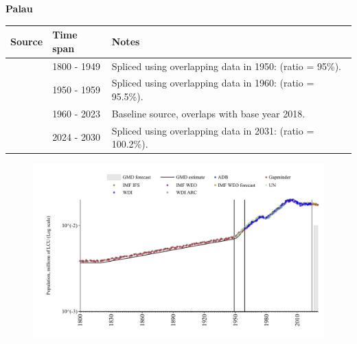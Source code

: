 \documentclass[12pt,a4paper,landscape]{article}
\begin{document}
\begin{adjustbox}{max totalsize={\paperwidth}{\paperheight},center}
\begin{minipage}[t][\textheight][t]{\textwidth}
\vspace*{0.5cm}
{}
\begin{center}
{\Large\bfseries Palau}
\end{center}
\vspace{0.5cm}
\begin{table}[H]
\centering
\small
\begin{tabular}{|l|l|l|}
\hline
\textbf{Source} & \textbf{Time span} & \textbf{Notes} \\
\hline
\rowcolor{white}\cite{Gapminder}& 1800 - 1949 &Spliced using overlapping data in 1950: (ratio = 95\%).\\
\rowcolor{lightgray}\cite{IMF_IFS}& 1950 - 1959 &Spliced using overlapping data in 1960: (ratio = 95.5\%).\\
\rowcolor{white}\cite{WDI}& 1960 - 2023 &Baseline source, overlaps with base year 2018.\\
\rowcolor{lightgray}\cite{Gapminder}& 2024 - 2030 &Spliced using overlapping data in 2031: (ratio = 100.2\%).\\
\hline
\end{tabular}
\end{table}
\begin{figure}[H]
\centering
\includegraphics[width=\textwidth,height=0.6\textheight,keepaspectratio]{graphs/PLW_pop.pdf}
\end{figure}
\end{minipage}
\end{adjustbox}
\end{document}
